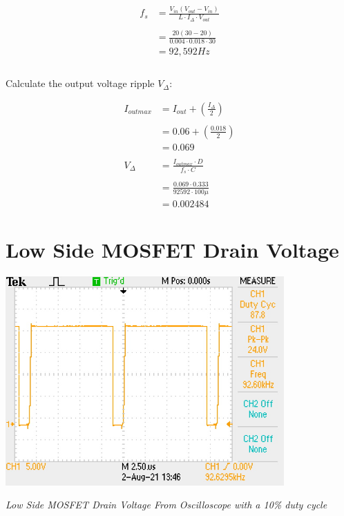 \documentclass[a4paper,11pt]{article}
\begin{document}
\begin{preview}
\begin{align*}
  f_{s}&=\frac{V_{in}\left(V_{out}-V_{in}\right)}{L\cdot I_{\Delta}\cdot V_{out}}\\\\
  &=\frac{20\left(30-20\right)}{0.004\cdot 0.018\cdot 30}\\
  &= 92,592Hz\\\\
\end{align*}

Calculate the output voltage ripple $V_{\Delta}$:

\begin{align*}
  I_{outmax}&=I_{out}+\left(\frac{I_{\Delta}}{2}\right)\\\\
  &=0.06+\left(\frac{0.018}{2}\right)\\
  &=0.069\\\\
  V_{\Delta} &= \frac{I_{outmax}\cdot D}{f_{s}\cdot C}\\\\
  &= \frac{0.069\cdot 0.333}{92592\cdot 100\mu}\\
  &=0.002484
\end{align*}


\section{Low Side MOSFET Drain Voltage}

\begin{center}
  \includegraphics[width = 0.8\textwidth]{drain_voltage.jpg}

  \textit{Low Side MOSFET Drain Voltage From Oscilloscope with a 10\% duty cycle}
\end{center}


\end{preview}
\end{document}
